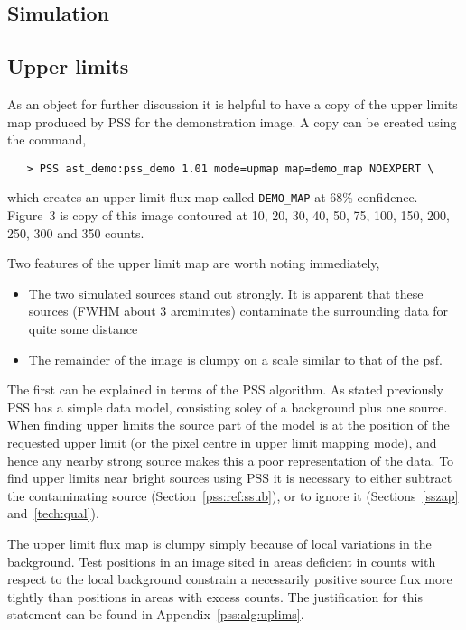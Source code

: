 \subsection{Simulation}

\subsection{Upper limits}
\label{tech:uplims}
As an object for further discussion it is helpful to have a copy of
the upper limits map produced by PSS for the demonstration image. A
copy can be created using the command,
\begin{verbatim}
   > PSS ast_demo:pss_demo 1.01 mode=upmap map=demo_map NOEXPERT \
\end{verbatim}
which creates an upper limit flux map called \verb+DEMO_MAP+ at 68\%
confidence. Figure~3 is copy of this image contoured at 10, 20, 30, 40,
50, 75, 100, 150, 200, 250, 300 and 350 counts.

Two features of the upper limit map are worth noting immediately,
\begin{itemize}                                          
\item The two simulated sources stand out strongly. It is apparent that
these sources (FWHM about 3 arcminutes) contaminate the surrounding data 
for quite some distance
\item The remainder of the image is clumpy on a scale similar to that
of the psf.
\end{itemize}
The first can be explained in terms of the PSS algorithm.  As stated
previously PSS has a simple data model, consisting soley of a background
plus one source. When finding upper limits the source part of the model
is at the position of the requested upper limit (or the pixel centre in
upper limit mapping mode), and hence any nearby strong source makes this
a poor representation of the data. To find upper limits near bright
sources using PSS it is necessary to either subtract the contaminating
source (Section~\ref{pss:ref:ssub}), or to ignore it 
(Sections~\ref{sszap} and~\ref{tech:qual}).

The upper limit flux map is clumpy simply because of local variations
in the background. Test positions in an image sited in areas deficient
in counts with respect to the local background constrain a
necessarily positive source flux more tightly than positions in areas 
with excess counts. The justification for this statement can be found
in Appendix~\ref{pss:alg:uplims}.

